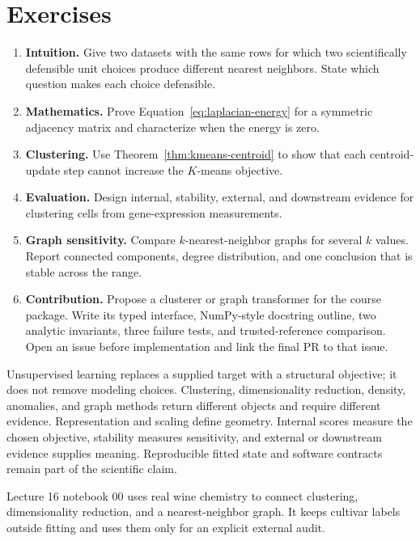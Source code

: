 \section{Exercises}
\begin{enumerate}
  \item \textbf{Intuition.} Give two datasets with the same rows for which two
  scientifically defensible unit choices produce different nearest neighbors.
  State which question makes each choice defensible.
  \item \textbf{Mathematics.} Prove Equation~\eqref{eq:laplacian-energy} for a
  symmetric adjacency matrix and characterize when the energy is zero.
  \item \textbf{Clustering.} Use Theorem~\ref{thm:kmeans-centroid} to show that
  each centroid-update step cannot increase the $K$-means objective.
  \item \textbf{Evaluation.} Design internal, stability, external, and downstream
  evidence for clustering cells from gene-expression measurements.
  \item \textbf{Graph sensitivity.} Compare $k$-nearest-neighbor graphs for
  several $k$ values. Report connected components, degree distribution, and one
  conclusion that is stable across the range.
  \item \textbf{Contribution.} Propose a clusterer or graph transformer for the
  course package. Write its typed interface, NumPy-style docstring outline, two
  analytic invariants, three failure tests, and trusted-reference comparison.
  Open an issue before implementation and link the final PR to that issue.
\end{enumerate}

\begin{chapterreview}
Unsupervised learning replaces a supplied target with a structural objective;
it does not remove modeling choices. Clustering, dimensionality reduction,
density, anomalies, and graph methods return different objects and require
different evidence. Representation and scaling define geometry. Internal
scores measure the chosen objective, stability measures sensitivity, and
external or downstream evidence supplies meaning. Reproducible fitted state and
software contracts remain part of the scientific claim.
\end{chapterreview}

\begin{notebooklink}
Lecture 16 notebook 00 uses real wine chemistry to connect clustering,
dimensionality reduction, and a nearest-neighbor graph. It keeps cultivar labels
outside fitting and uses them only for an explicit external audit.
\end{notebooklink}
